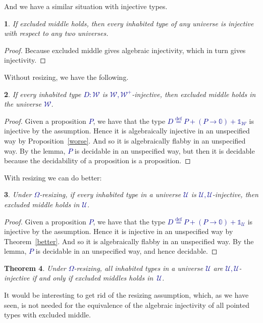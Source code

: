 \documentclass[10pt]{article}
\newcommand{\db}{\textcolor{darkblue}}
\newcommand{\df}[1]{\emph{\db{#1}}}
\newcommand{\m}[1]{\db{$#1$}}
\newcommand{\U}{\mathcal{U}}
\newcommand{\W}{\mathcal{W}}
\newcommand{\Zero}{\mathbb{0}}
\newcommand{\One}{\mathbb{1}}
\newcommand{\eqdef}{\overset{\text{def}}{=}}
\newtheorem{numbered}{}
\newtheorem{theorem}[numbered]{Theorem}
\theoremstyle{definition}
\begin{document}
\noindent
And we have a similar situation with injective types.
\begin{numbered}
  If excluded middle holds, then every inhabited type of any universe is
  injective with respect to any two universes.
\end{numbered}
\begin{proof}
  Because excluded middle gives algebraic injectivity, which in turn gives
  injectivity.
\end{proof}
\noindent Without resizing, we have the following.
\begin{numbered}
  If every inhabited type \m{D:\W} is \m{\W,\W^+}-injective, then
  excluded middle holds in the universe \m{\W}.
\end{numbered}
\begin{proof}
  Given a proposition \m{P}, we have that the type \m{D \eqdef P + (P
    \to \Zero) + \One_{\W}} is injective by the assumption. Hence it
  is algebraically injective in an unspecified way by
  Proposition~\ref{worse}. And so it is algebraically flabby in an
  unspecified way.  By the lemma, \m{P} is decidable in an unspecified
  way, but then it is decidable because the decidability of a
  proposition is a proposition.
\end{proof}
\noindent With resizing we can do better:
\begin{numbered}
  Under \m{\Omega}-resizing, if every inhabited type in a universe \m{\U} is
  \m{\U,\U}-injective, then excluded middle holds in \m{\U}.
\end{numbered}
\begin{proof}
  Given a proposition \m{P}, we have that the type \m{D \eqdef P + (P
    \to \Zero) + \One_{\U}} is injective by the assumption. Hence it
  is injective in an unspecified way by
  Theorem~\ref{better}. And so it is algebraically flabby in an
  unspecified way.  By the lemma, \m{P} is decidable in an unspecified
  way, and hence decidable.
\end{proof}
\begin{theorem} %
  Under \m{\Omega}-resizing, all inhabited types in a universe \m{\U} are
  \m{\U,\U}-injective if and only if excluded middles
  holds in~\m{\U}.
\end{theorem}
\noindent It would be interesting to get rid of the resizing assumption, which,
as we have seen, is not needed for the equivalence of the algebraic
injectivity of all pointed types with excluded middle.



\end{document}
